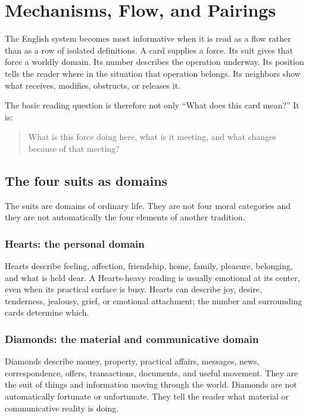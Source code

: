 \chapter{Mechanisms, Flow, and Pairings}

The English system becomes most informative when it is read as a flow rather
than as a row of isolated definitions. A card supplies a force. Its suit gives
that force a worldly domain. Its number describes the operation underway. Its
position tells the reader where in the situation that operation belongs. Its
neighbors show what receives, modifies, obstructs, or releases it.

The basic reading question is therefore not only ``What does this card mean?''
It is:

\begin{quote}
What is this force doing here, what is it meeting, and what changes because of
that meeting?
\end{quote}

\section{The four suits as domains}

The suits are domains of ordinary life. They are not four moral categories and
they are not automatically the four elements of another tradition.

\subsection{Hearts: the personal domain}

Hearts describe feeling, affection, friendship, home, family, pleasure,
belonging, and what is held dear. A Hearts-heavy reading is usually emotional
at its center, even when its practical surface is busy. Hearts can describe
joy, desire, tenderness, jealousy, grief, or emotional attachment; the number
and surrounding cards determine which.

\subsection{Diamonds: the material and communicative domain}

Diamonds describe money, property, practical affairs, messages, news,
correspondence, offers, transactions, documents, and useful movement. They are
the suit of things and information moving through the world. Diamonds are not
automatically fortunate or unfortunate. They tell the reader what material or
communicative reality is doing.

